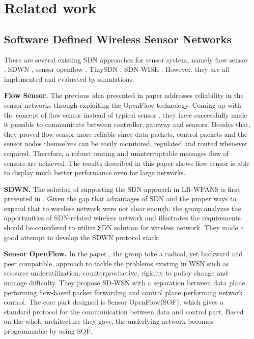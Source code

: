 \section{Related work}

\subsection{Software Defined Wireless Sensor Networks}


There are several existing SDN approaches for sensor system, 
namely flow sensor \cite{mahmud2011exploitation}, SDWN \cite{costanzo2012software},
sensor openflow \cite{luo2012sensor}, TinySDN \cite{de2015tinysdn}, SDN-WISE \cite{galluccio2015sdn}.
However, they are all implemented and evaluated by simulations. 

\textbf{Flow Sensor.}
The previous idea presented in paper \cite{mahmud2011exploitation} addresses reliability in the sensor networks through exploiting the OpenFlow technology. Coming up with the concept of flow-sensor instead of typical sensor \cite{Liu2015Thermoresistive}, they have successfully made it possible to communicate between controller, gateway and sensors. Besides that, they proved flow sensor more reliable since data packets, control packets and the sensor nodes themselves can be easily monitored, regulated and routed whenever required. Therefore, a robust routing and uninterruptable messages flow of sensors are achieved. The results described in this paper shows flow-sensor is able to display much better performance even for large networks.

\textbf{SDWN.}
The solution of supporting the SDN approach in LR-WPANS is first presented in \cite{costanzo2012software}. Given the gap that advantages of SDN and the proper ways to expand that to wireless network were not clear enough, the group analyzes the opportunities of SDN-related wireless network and illustrates the requirements should be considered to utilize SDN solution for wireless network. They made a good attempt to develop the SDWN protocol stack.

\textbf{Sensor OpenFlow.}
In the paper \cite{luo2012sensor}, the group toke a radical, yet backward and peer compatible, approach to tackle the problems existing in WSN such as resource underutilization, counterproductive, rigidity to policy change and manage difficulty. They propose SD-WSN with a separation between data plane performing flow-based packet forwarding and control plane performing network control. The core part designed is Sensor OpenFlow(SOF), which gives a standard protocol for the communication between data and control part. Based on the whole architecture they gave, the underlying network becomes programmable by using SOF.

